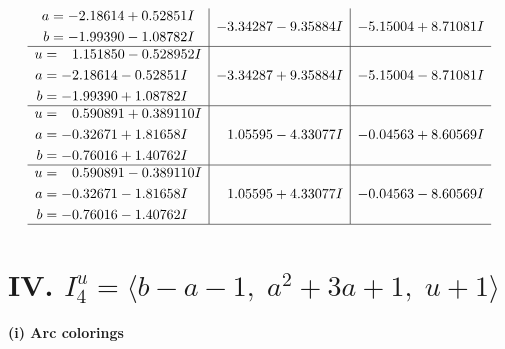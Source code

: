 \documentclass[1p]{elsarticle_modified}
\theoremstyle{definition}
\begin{document}
$$\begin{array}{c|c|c}
\begin{aligned}
a &= -2.18614 + 0.52851 I \\
b &= -1.99390 - 1.08782 I\end{aligned}
 & -3.34287 - 9.35884 I & -5.15004 + 8.71081 I \\ \hline\begin{aligned}
u &= \phantom{-}1.151850 - 0.528952 I \\
a &= -2.18614 - 0.52851 I \\
b &= -1.99390 + 1.08782 I\end{aligned}
 & -3.34287 + 9.35884 I & -5.15004 - 8.71081 I \\ \hline\begin{aligned}
u &= \phantom{-}0.590891 + 0.389110 I \\
a &= -0.32671 + 1.81658 I \\
b &= -0.76016 + 1.40762 I\end{aligned}
 & \phantom{-}1.05595 - 4.33077 I & -0.04563 + 8.60569 I \\ \hline\begin{aligned}
u &= \phantom{-}0.590891 - 0.389110 I \\
a &= -0.32671 - 1.81658 I \\
b &= -0.76016 - 1.40762 I\end{aligned}
 & \phantom{-}1.05595 + 4.33077 I & -0.04563 - 8.60569 I\\
 \hline 
 \end{array}$$\newpage\newpage\renewcommand{\arraystretch}{1}
\centering \section*{IV. $I^u_{4}= \langle b- a-1,\;a^2+3 a+1,\;u+1 \rangle$}
\flushleft \textbf{(i) Arc colorings}\\
\end{document}
